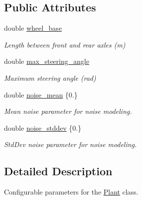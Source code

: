\subsection*{Public Attributes}
\begin{DoxyCompactItemize}
\item 
\mbox{\label{structfake_1_1_plant_options_ab136248a415d91829342f3f7249c3d90}} 
double \hyperlink{structfake_1_1_plant_options_ab136248a415d91829342f3f7249c3d90}{wheel\+\_\+base}
\begin{DoxyCompactList}\small\item\em Length between front and rear axles (m) \end{DoxyCompactList}\item 
\mbox{\label{structfake_1_1_plant_options_a9161f2e40ab9030eeb46ad4ea297700e}} 
double \hyperlink{structfake_1_1_plant_options_a9161f2e40ab9030eeb46ad4ea297700e}{max\+\_\+steering\+\_\+angle}
\begin{DoxyCompactList}\small\item\em Maximum steering angle (rad) \end{DoxyCompactList}\item 
\mbox{\label{structfake_1_1_plant_options_a3c98272e9031a261e4d3460a8bde633a}} 
double \hyperlink{structfake_1_1_plant_options_a3c98272e9031a261e4d3460a8bde633a}{noise\+\_\+mean} \{0.\}
\begin{DoxyCompactList}\small\item\em Mean noise parameter for noise modeling. \end{DoxyCompactList}\item 
\mbox{\label{structfake_1_1_plant_options_a381db64a553b56841feba39d723ecbf9}} 
double \hyperlink{structfake_1_1_plant_options_a381db64a553b56841feba39d723ecbf9}{noise\+\_\+stddev} \{0.\}
\begin{DoxyCompactList}\small\item\em Std\+Dev noise parameter for noise modeling. \end{DoxyCompactList}\end{DoxyCompactItemize}


\subsection{Detailed Description}
Configurable parameters for the \hyperlink{classfake_1_1_plant}{Plant} class. 


